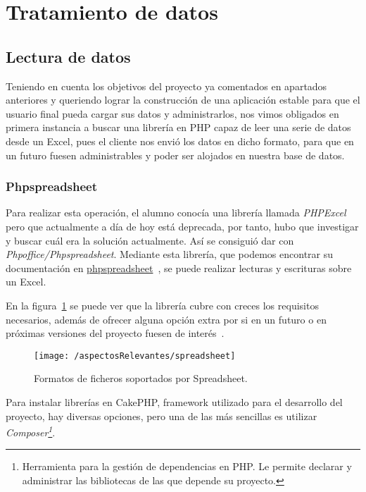 
\section{Tratamiento de datos}

\subsection{Lectura de datos}

Teniendo en cuenta los objetivos del proyecto ya comentados en apartados anteriores y queriendo lograr la construcción de una aplicación estable para que el usuario final pueda cargar sus datos y administrarlos, nos vimos obligados en primera instancia a buscar una librería en PHP capaz de leer una serie de datos desde un Excel, pues el cliente nos envió los datos en dicho formato, para que en un futuro fuesen administrables y poder ser alojados en nuestra base de datos.

\subsubsection{Phpspreadsheet}

Para realizar esta operación, el alumno conocía una librería llamada \textit{PHPExcel} pero que actualmente a día de hoy está deprecada, por tanto, hubo que investigar y buscar cuál era la solución actualmente. Así se consiguió dar con \textit{Phpoffice/Phpspreadsheet}. Mediante esta librería, que podemos encontrar su documentación en \href{https://phpspreadsheet.readthedocs.io/en/develop/}{phpspreadsheet}~\cite{web:spreadsheet}, se puede realizar lecturas y escrituras sobre un Excel. 

En la figura~\ref{fig:spreadsheet} se puede ver que la librería cubre con creces los requisitos necesarios, además de ofrecer alguna opción extra por si en un futuro o en próximas versiones del proyecto fuesen de interés~\cite{web:spreadsheet}.

\begin{figure}[ht]
	\centering
	\texttt{[image: /aspectosRelevantes/spreadsheet]}
	\caption{Formatos de ficheros soportados por Spreadsheet.}
	\label{fig:spreadsheet}
\end{figure}

Para instalar librerías en CakePHP, framework utilizado para el desarrollo del proyecto, hay diversas opciones, pero una de las más sencillas es utilizar \textit{Composer\footnote{Herramienta para la gestión de dependencias en PHP. Le permite declarar y administrar las bibliotecas de las que depende su proyecto.}}.


